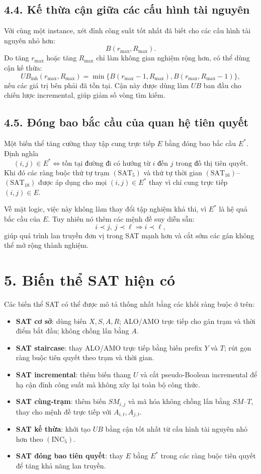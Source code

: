 \documentclass[12pt]{article}
\begin{document}
\subsection*{4.4. Kế thừa cận giữa các cấu hình tài nguyên}

Với cùng một instance, xét đỉnh công suất tốt nhất đã biết cho các cấu hình tài nguyên nhỏ hơn:
\[
B(r_{\max},R_{\max}).
\]
Do tăng $r_{\max}$ hoặc tăng $R_{\max}$ chỉ làm không gian nghiệm rộng hơn, có thể dùng cận kế thừa:
\[
UB_{\text{inh}}(r_{\max},R_{\max})
=
\min\Big\{
B(r_{\max}-1,R_{\max}),
B(r_{\max},R_{\max}-1)
\Big\},
\tag{INC\_5}
\]
nếu các giá trị bên phải đã tồn tại. Cận này được dùng làm $UB$ ban đầu cho chiến lược incremental, giúp giảm số vòng tìm kiếm.

\subsection*{4.5. Đóng bao bắc cầu của quan hệ tiên quyết}

Một biến thể tăng cường thay tập cung trực tiếp $E$ bằng đóng bao bắc cầu $E^*$. Định nghĩa
\[
(i,j)\in E^*
\Longleftrightarrow
\text{tồn tại đường đi có hướng từ }i\text{ đến }j\text{ trong đồ thị tiên quyết}.
\]
Khi đó các ràng buộc thứ tự trạm $(\mathrm{SAT}_{5})$ và thứ tự thời gian $(\mathrm{SAT}_{16})$--$(\mathrm{SAT}_{18})$ được áp dụng cho mọi $(i,j)\in E^*$ thay vì chỉ cung trực tiếp $(i,j)\in E$.

Về mặt logic, việc này không làm thay đổi tập nghiệm khả thi, vì $E^*$ là hệ quả bắc cầu của $E$. Tuy nhiên nó thêm các mệnh đề suy diễn sẵn:
\[
i\prec j,\ j\prec \ell
\Longrightarrow
i\prec \ell,
\]
giúp quá trình lan truyền đơn vị trong SAT mạnh hơn và cắt sớm các gán không thể mở rộng thành nghiệm.

\section*{5. Biến thể SAT hiện có}

Các biến thể SAT có thể được mô tả thống nhất bằng các khối ràng buộc ở trên:

\begin{itemize}[leftmargin=*]
\item \textbf{SAT cơ sở}: dùng biến $X,S,A,R$; ALO/AMO trực tiếp cho gán trạm và thời điểm bắt đầu; không chồng lấn bằng $A$.
\item \textbf{SAT staircase}: thay ALO/AMO trực tiếp bằng biến prefix $Y$ và $T$; rút gọn ràng buộc tiên quyết theo trạm và thời gian.
\item \textbf{SAT incremental}: thêm biến thang $U$ và cắt pseudo-Boolean incremental để hạ cận đỉnh công suất mà không xây lại toàn bộ công thức.
\item \textbf{SAT cùng-trạm}: thêm biến $SM_{i,j}$ và mã hóa không chồng lấn bằng $SM$--$T$, thay cho mệnh đề trực tiếp với $A_{i,t},A_{j,t}$.
\item \textbf{SAT kế thừa}: khởi tạo $UB$ bằng cận tốt nhất từ cấu hình tài nguyên nhỏ hơn theo $(\mathrm{INC}_{5})$.
\item \textbf{SAT đóng bao tiên quyết}: thay $E$ bằng $E^*$ trong các ràng buộc tiên quyết để tăng khả năng lan truyền.
\end{itemize}
\end{document}
